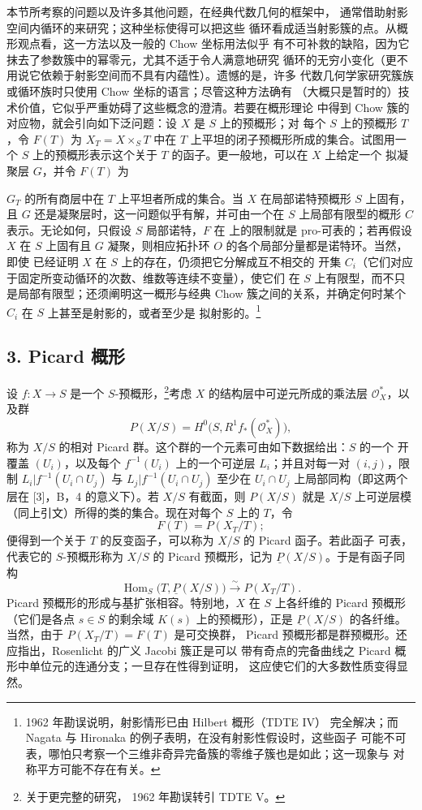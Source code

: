  本节所考察的问题以及许多其他问题，在经典代数几何的框架中，
通常借助射影空间内循环的来研究；这种坐标使得可以把这些
循环看成适当射影簇的点。从概形观点看，这一方法以及一般的 Chow 坐标用法似乎
有不可补救的缺陷，因为它抹去了参数簇中的幂零元，尤其不适于令人满意地研究
循环的无穷小变化（更不用说它依赖于射影空间而不具有内蕴性）。遗憾的是，许多
代数几何学家研究簇族或循环族时只使用 Chow 坐标的语言；尽管这种方法确有
（大概只是暂时的）技术价值，它似乎严重妨碍了这些概念的澄清。若要在概形理论
中得到 Chow 簇的对应物，就会引向如下泛问题：设 $X$ 是 $S$ 上的预概形；对
每个 $S$ 上的预概形 $T$，令 $F(T)$ 为
$X_T=X\times_ST$ 中在 $T$ 上平坦的闭子预概形所成的集合。试图用一个
$S$ 上的预概形表示这个关于 $T$ 的函子。更一般地，可以在 $X$ 上给定一个
拟凝聚层 $G$，并令 $F(T)$ 为

$G_T$ 的所有商层中在 $T$ 上平坦者所成的集合。当 $X$ 在局部诺特预概形
$S$ 上固有，且
$G$ 还是凝聚层时，这一问题似乎有解，并可由一个在 $S$ 上局部有限型的概形
$C$ 表示。无论如何，只假设 $S$ 局部诺特，$F$ 在
上的限制就是 pro-可表的；若再假设 $X$ 在 $S$
上固有且 $G$ 凝聚，则相应拓扑环 $O$ 的各个局部分量都是诺特环。当然，即使
已经证明 $X$ 在 $S$ 上的存在，仍须把它分解成互不相交的
开集 $C_i$（它们对应于固定所变动循环的次数、维数等连续不变量），使它们
在 $S$ 上有限型，而不只是局部有限型；还须阐明这一概形与经典 Chow
簇之间的关系，并确定何时某个 $C_i$ 在 $S$ 上甚至是射影的，或者至少是
拟射影的。\footnote{1962 年勘误说明，射影情形已由 Hilbert 概形（TDTE IV）
完全解决；而 Nagata 与 Hironaka 的例子表明，在没有射影性假设时，这些函子
可能不可表，哪怕只考察一个三维非奇异完备簇的零维子簇也是如此；这一现象与
对称平方可能不存在有关。}

\subsection*{3. Picard 概形}

设 $f:X\longrightarrow S$ 是一个 $S$-预概形，\footnote{关于更完整的研究，
1962 年勘误转引 TDTE V。}考虑 $X$ 的结构层中可逆元所成的乘法层
$\mathcal O_X^*$，以及群
\[
  P(X/S)=H^0\bigl(S,R^1f_*(\mathcal O_X^*)\bigr),
\]
称为 $X/S$ 的相对 Picard 群。这个群的一个元素可由如下数据给出：$S$ 的一个
开覆盖 $(U_i)$，以及每个 $f^{-1}(U_i)$ 上的一个可逆层 $L_i$；并且对每一对
$(i,j)$，限制 $L_i|f^{-1}(U_i\cap U_j)$ 与
$L_j|f^{-1}(U_i\cap U_j)$ 至少在 $U_i\cap U_j$ 上局部同构（即这两个层在
[3]，B，4 的意义下）。若 $X/S$ 有截面，则 $P(X/S)$ 就是
$X/S$ 上可逆层模（同上引文）所得的类的集合。现在对每个
$S$ 上的 $T$，令
\[
  F(T)=P(X_T/T) ;
\]
便得到一个关于 $T$ 的反变函子，可以称为 $X/S$ 的 Picard 函子。若此函子
可表，代表它的 $S$-预概形称为 $X/S$ 的 Picard 预概形，记为
$\underline P(X/S)$。于是有函子同构
\[
  \operatorname{Hom}_S\bigl(T,\underline P(X/S)\bigr)
  \xrightarrow{\sim}P(X_T/T).
\]
Picard 预概形的形成与基扩张相容。特别地，$X$ 在 $S$ 上各纤维的 Picard
预概形（它们是各点 $s\in S$ 的剩余域 $K(s)$ 上的预概形），正是
$\underline P(X/S)$ 的各纤维。当然，由于 $P(X_T/T)=F(T)$ 是可交换群，
Picard 预概形都是群预概形。还应指出，Rosenlicht 的广义 Jacobi 簇正是可以
带有奇点的完备曲线之 Picard 概形中单位元的连通分支；一旦存在性得到证明，
这应使它们的大多数性质变得显然。

